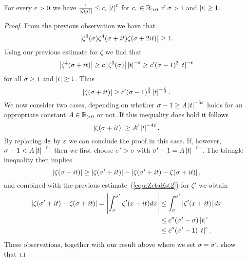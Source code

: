 \begin{proposition}
	For every $\varepsilon > 0$ we have $\frac{1}{\left|\zeta(s)\right|} \leq c_\varepsilon \left|t\right|^\varepsilon$ for $c_\varepsilon \in \mathbb{R}_{> 0}$ if $\sigma > 1$ and $\left|t\right| \geq 1$.
\end{proposition}
\begin{proof}
	From the previous observation we have that
\begin{equation*}
	\left|\zeta^3(\sigma) \zeta^4(\sigma + it) \zeta(\sigma + 2it)\right| \geq 1.
\end{equation*}
	Using our previous estimate for $\zeta$ we find that
\begin{equation*}
	\left|\zeta^4(\sigma + it)\right| \geq c \left|\zeta^3(\sigma)\right| \left|t\right|^{-\varepsilon} \geq c' (\sigma - 1)^3 \left|t\right|^{-\varepsilon}
\end{equation*}
	for all $\sigma \geq 1$ and $\left|t\right| \geq 1$. Thus
\begin{equation*}
	\left|\zeta(\sigma + it)\right| \geq c' (\sigma - 1)^{\frac{3}{4}} \left|t\right|^{-\frac{\varepsilon}{4}}.
\end{equation*}
	We now consider two cases, depending on whether $\sigma - 1 \geq A\left|t\right|^{-5 \varepsilon}$ holds for an appropriate constant $A \in \mathbb{R}_{> 0}$ or not. If this inequality does hold it follows
\begin{equation*}
	\left|\zeta(\sigma + it)\right| \geq A' \left|t\right|^{-4 \varepsilon}.
\end{equation*}
	By replacing $4 \varepsilon$ by $\varepsilon$ we can conclude the proof in this case. If, however, $\sigma - 1 < A\left|t\right|^{-5 \varepsilon}$ then we first choose $\sigma' > \sigma$ with $\sigma' - 1 = A \left|t\right|^{-5 \varepsilon}$. The triangle inequality then implies
\begin{equation*}
	\left|\zeta(\sigma + it)\right| \geq \left|\zeta(\sigma' + it)\right| - \left|\zeta(\sigma' + it) - \zeta(\sigma + it)\right|,
\end{equation*}
	and combined with the previous estimate~(\ref{equ:ZetaEst2}) for $\zeta'$ we obtain
\begin{equation*}
\begin{aligned}	
	\left|\zeta(\sigma' + it) - \zeta(\sigma + it)\right| = \left|\int _\sigma ^{\sigma'} \zeta'(x + it) dx\right|
	&\leq \int _\sigma ^{\sigma'} \left|\zeta'(x + it)\right| dx \\ 
	&\leq c'' (\sigma' - \sigma) \left|t\right|^{\varepsilon} \\
	&\leq c''(\sigma' - 1)\left|t\right|^{\varepsilon}.
\end{aligned}
\end{equation*}
	These observations, together with our result above where we set $\sigma = \sigma'$, show that

\end{proof}
